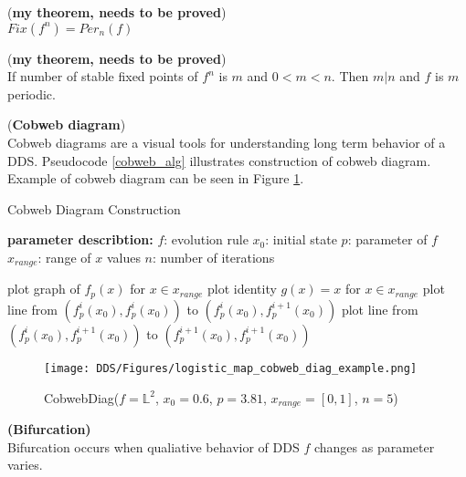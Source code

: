 \begin{theorem} (\textbf{my theorem, needs to be proved})\\
$Fix(f^n) = Per_n(f)$
\end{theorem}

\begin{theorem} (\textbf{my theorem, needs to be proved})\\
If number of stable fixed points of $f^n$ is $m$ and $0<m<n$.
Then $m|n$ and $f$ is $m$ periodic.
\end{theorem}

\begin{remark} (\textbf{Cobweb diagram}) \\
    \label{def:cobweb}
    Cobweb diagrams are a visual tools for understanding long term behavior of a DDS.
    Pseudocode \ref{cobweb_alg} illustrates construction of cobweb diagram.
    Example of cobweb diagram can be seen in Figure \ref{fig:cobweb_diag_example}.
\end{remark}

\begin{algorithm}
\caption{Cobweb Diagram Construction}\label{cobweb_alg}
\begin{algorithmic}[1]
\Statex \textbf{parameter describtion:}
\Statex $f$: evolution rule
\Statex $x_0$: initial state
\Statex $p$: parameter of $f$
\Statex $x_{range}$: range of $x$ values
\Statex $n$: number of iterations
\Statex

\State plot graph of $f_p(x)$ for $x \in x_{range}$
\State plot identity $g(x)=x$ for $x \in x_{range}$
\State plot line from $(f_{p}^{i}(x_0), f_{p}^{i}(x_0))$ to $(f_{p}^{i}(x_0), f_{p}^{i+1}(x_0))$
\State plot line from $(f_{p}^{i}(x_0), f_{p}^{i+1}(x_0))$ to $(f_{p}^{i+1}(x_0), f_{p}^{i+1}(x_0))$
\EndFor
\EndFunction

\end{algorithmic}
\end{algorithm}

\begin{figure}[!h]
    \centering
    \texttt{[image: DDS/Figures/logistic\_map\_cobweb\_diag\_example.png]}
    \caption{CobwebDiag($f = \mathbb{L}^2$, $x_0 = 0.6$, $p = 3.81$, $x_{range} = [0, 1]$, $n = 5$)}
    \label{fig:cobweb_diag_example}
\end{figure}

\begin{definition} \textbf{(Bifurcation)} \\
    \label{def:bifurcation}
    Bifurcation occurs when qualiative behavior of DDS $f$ changes as parameter varies.
\end{definition}

